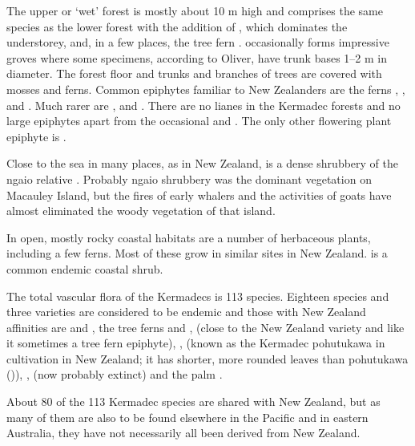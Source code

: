 The upper or `wet' forest is mostly about 10 m high and comprises the same species as the lower forest with the addition of , which dominates the understorey, and, in a few places, the tree fern .  occasionally forms impressive groves where some specimens, according to Oliver, have trunk bases 1–2 m in diameter.
The forest floor and trunks and branches of trees are covered with mosses and ferns.
Common epiphytes familiar to New Zealanders are the ferns , ,  and .
Much rarer are ,  and .
There are no lianes in the Kermadec forests and no large epiphytes apart from the occasional  and .
The only other flowering plant epiphyte is .

Close to the sea in many places, as in New Zealand, is a dense shrubbery of the ngaio relative .
Probably ngaio shrubbery was the dominant vegetation on Macauley Island, but the fires of early whalers and the activities of goats have almost eliminated the woody vegetation of that island.

In open, mostly rocky coastal habitats are a number of herbaceous plants, including a few ferns.
Most of these grow in similar sites in New Zealand.  is a common endemic coastal shrub.

The total vascular flora of the Kermadecs is 113 species.
Eighteen species and three varieties are considered to be endemic and those with New Zealand affinities are  and , the tree ferns  and ,   (close to the New Zealand variety and like it sometimes a tree fern epiphyte), , (known as the Kermadec pohutukawa in cultivation in New Zealand; it has shorter, more rounded leaves than pohutukawa ()), ,  (now probably extinct) and the palm .

About 80 of the 113 Kermadec species are shared with New Zealand, but as many of them are also to be found elsewhere in the Pacific and in eastern Australia, they have not necessarily all been derived from New Zealand.

